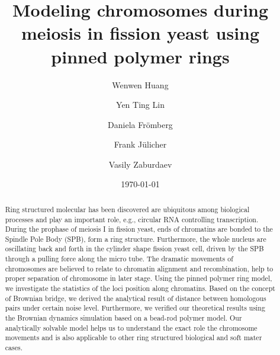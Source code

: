 \documentclass[preprint,aps,draft]{revtex4}
\begin{document}
\title{Modeling chromosomes during meiosis in fission yeast using pinned polymer rings}

\author{Wenwen Huang}
\author{Yen Ting Lin}
\author{Daniela Fr\"{o}mberg}
\author{Frank J\"{u}licher}
\author{Vasily Zaburdaev}

\date{\today}

\begin{abstract}
Ring structured molecular has been discovered are ubiquitous among biological processes and play an important role, e.g., circular RNA controlling transcription. 
During the prophase of meiosis I in fission yeast, ends of chromatins are bonded to the Spindle Pole Body (SPB), form a ring structure. 
Furthermore, the whole nucleus are oscillating back and forth in the cylinder shape fission yeast cell, driven by the SPB through a pulling force along the micro tube.
The dramatic movements of chromosomes are believed to relate to chromatin alignment and recombination, help to proper separation of chromosome in later stage.
Using the pinned polymer ring model, we investigate the statistics of the loci position along chromatins.
Based on the concept of Brownian bridge, we derived the analytical result of distance between homologous pairs under certain noise level.
Furthermore, we verified our theoretical results using the Brownian dynamics simulation based on a bead-rod polymer model.
Our analytically solvable model helps us to understand the exact role the chromosome movements and is also applicable to other ring structured biological and soft mater cases.

	

\end{abstract}
\maketitle
\end{document}
